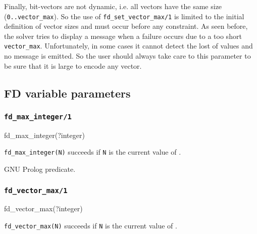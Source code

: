 Finally, bit-vectors are not dynamic, i.e. all vectors have the same size
(\texttt{0..vector\_max}). So the use of \texttt{fd\_set\_vector\_max/1} is
limited to the initial definition of vector sizes and must occur before any
constraint. As seen before, the solver tries to display a message when a
failure occurs due to a too short \texttt{vector\_max}. Unfortunately, in
some cases it cannot detect the lost of values and no message is emitted. So
the user should always take care to this parameter to be sure that it is
large to encode any vector.

\subsection{FD variable parameters}

\subsubsection{\texttt{fd\_max\_integer/1}}
\label{fd-max-integer/1}

\begin{TemplatesOneCol}
fd\_max\_integer(?integer)

\end{TemplatesOneCol}

\Description

\texttt{fd\_max\_integer(N)} succeeds if \texttt{N} is the current value of
 .

\begin{PlErrors}


\end{PlErrors}

\Portability

GNU Prolog predicate.

\subsubsection{\texttt{fd\_vector\_max/1}}

\begin{TemplatesOneCol}
fd\_vector\_max(?integer)

\end{TemplatesOneCol}

\Description

\texttt{fd\_vector\_max(N)} succeeds if \texttt{N} is the current value of
 .

